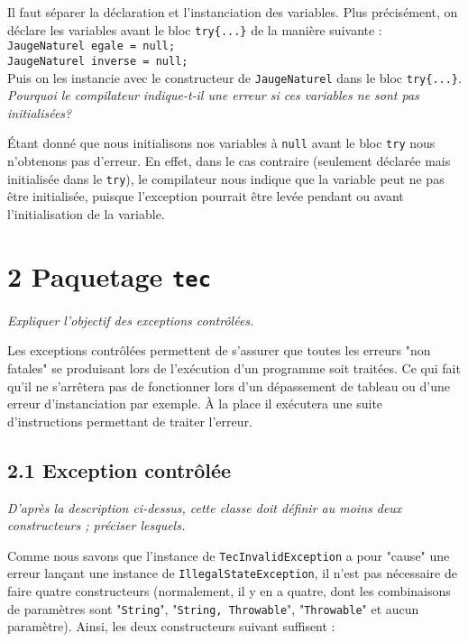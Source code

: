 \documentclass{article}
\begin{document}
Il faut séparer la déclaration et l'instanciation des variables. Plus précisément, on déclare les variables avant le bloc \texttt{try\{...\}} de la manière suivante :\\
\texttt{JaugeNaturel egale = null;\\
  JaugeNaturel inverse = null;}\\
Puis on les instancie avec le constructeur de \texttt{JaugeNaturel} dans le bloc \texttt{try\{...\}}.\\

\noindent \emph{Pourquoi le compilateur indique-t-il une erreur si ces variables ne sont pas initialisées?}

Étant donné que nous initialisons nos variables à \texttt{null} avant le bloc \texttt{try} nous n'obtenons pas d'erreur. En effet, dans le cas contraire (seulement déclarée mais initialisée dans le \texttt{try}), le compilateur nous indique que la variable peut ne pas être initialisée, puisque l'exception pourrait être levée pendant ou avant l'initialisation de la variable. 

\section*{2 Paquetage \texttt{tec}}

\emph{Expliquer l’objectif des exceptions contrôlées.}

Les exceptions contrôlées permettent de s'assurer que toutes les erreurs "non fatales" se produisant lors de l'exécution d'un programme soit traitées. Ce qui fait qu'il ne s'arrêtera pas de fonctionner lors d'un dépassement de tableau ou d'une erreur d'instanciation par exemple. \`A la place il exécutera une suite d'instructions permettant de traiter l'erreur.\\


\subsection*{2.1 Exception contrôlée}

\noindent \emph{D’après la description ci-dessus, cette classe doit définir au moins deux constructeurs ; préciser lesquels.}

Comme nous savons que l’instance de \texttt{TecInvalidException} a pour "cause" une erreur lançant une instance de \texttt{IllegalStateException}, il n'est pas n\'ecessaire de faire quatre constructeurs (normalement, il y en a quatre, dont les combinaisons de param\`etres sont "\texttt{String}", "\texttt{String, Throwable}", "\texttt{Throwable}" et aucun param\`etre). Ainsi, les deux constructeurs suivant suffisent :
\end{document}
